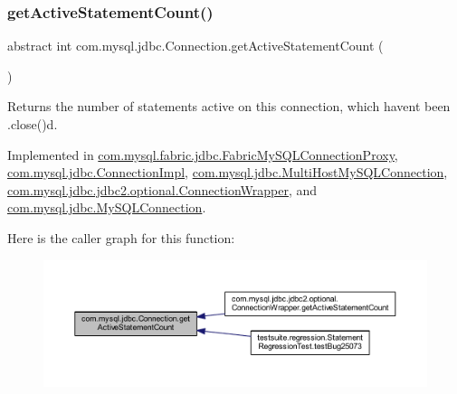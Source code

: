 \subsubsection{\texorpdfstring{get\+Active\+Statement\+Count()}{getActiveStatementCount()}}
{\footnotesize\ttfamily abstract int com.\+mysql.\+jdbc.\+Connection.\+get\+Active\+Statement\+Count (\begin{DoxyParamCaption}{ }\end{DoxyParamCaption})\hspace{0.3cm}{\ttfamily [abstract]}}

Returns the number of statements active on this connection, which haven\textquotesingle{}t been .close()d. 

Implemented in \mbox{\hyperlink{classcom_1_1mysql_1_1fabric_1_1jdbc_1_1_fabric_my_s_q_l_connection_proxy_acf661f15fbd7b77665f37e17cfa24520}{com.\+mysql.\+fabric.\+jdbc.\+Fabric\+My\+S\+Q\+L\+Connection\+Proxy}}, \mbox{\hyperlink{classcom_1_1mysql_1_1jdbc_1_1_connection_impl_ab89e48067b2d2b3e3257896c5bed6706}{com.\+mysql.\+jdbc.\+Connection\+Impl}}, \mbox{\hyperlink{classcom_1_1mysql_1_1jdbc_1_1_multi_host_my_s_q_l_connection_a88b613d50112e08095b5f72017b4deea}{com.\+mysql.\+jdbc.\+Multi\+Host\+My\+S\+Q\+L\+Connection}}, \mbox{\hyperlink{classcom_1_1mysql_1_1jdbc_1_1jdbc2_1_1optional_1_1_connection_wrapper_a72b79457a247fb0cedc5437e3d0d4cf2}{com.\+mysql.\+jdbc.\+jdbc2.\+optional.\+Connection\+Wrapper}}, and \mbox{\hyperlink{interfacecom_1_1mysql_1_1jdbc_1_1_my_s_q_l_connection_aa42802b4debbacd9680e2ca0b70fd53d}{com.\+mysql.\+jdbc.\+My\+S\+Q\+L\+Connection}}.

Here is the caller graph for this function\+:\nopagebreak
\begin{figure}[H]
\begin{center}
\leavevmode
\includegraphics[width=350pt]{interfacecom_1_1mysql_1_1jdbc_1_1_connection_a7a8d8535f6988783755465a542f45ea1_icgraph}
\end{center}
\end{figure}
\mbox{\label{interfacecom_1_1mysql_1_1jdbc_1_1_connection_ab681fd9ce4ce7b52529c0bea9134fc7c}} 
